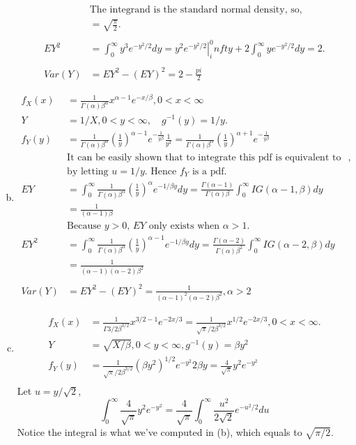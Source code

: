 \documentclass[letter]{article}
\newcommand{\Gal}{\Gamma(\alpha)}
\newcommand{\Iy}{\frac{1}{y}}
\newcommand{\Beal}{\beta^\alpha}
\newcommand{\intzi}{\int_0^\infty}
\begin{document}
\begin{enumerate}[(a)]
\begin{align*}
    & \text{The integrand is the standard normal density, so},\\
    & = \sqrt{\frac{\pi}{2}}.\\
    \\
    EY^2 & = \intzi y^3 e^{-y^2/2} dy = \left. y^2 e^{-y^2/2} \right|^0_infty + 2 \intzi ye^{-y^2/2} dy = 2.\\
    \\
    Var(Y) & = EY^2 - (EY)^2 = 2-\frac{pi}{2}
    \end{align*}
    \item 
    \begin{align*}
    f_X(x) & = \frac{1}{\Gal \Beal} x^{\alpha-1} e^{-x/\beta}, 0 < x < \infty \\
    Y & = 1/X, 0 < y < \infty, \quad g^{-1}(y) = 1/y.\\
    f_Y(y) & = \frac{1}{\Gal \Beal} (\frac{1}{y})^{\alpha-1} e^{-\frac{1}{y\beta}} \frac{1}{y^2} = 
    \frac{1}{\Gal \Beal} (\frac{1}{y})^{\alpha+1} e^{-\frac{1}{y\beta}} \\
    & \text{It can be easily shown that to integrate this pdf is equivalent to integrate a gamma density},\\
    & \text{by letting $u = 1/y$. Hence $f_Y$ is a pdf}.\\ 
    EY & = \intzi \frac{1}{\Gal \Beal} (\Iy)^\alpha e^{-1/\beta y} dy = \frac{\Gamma(\alpha-1)}{\Gal \beta} \intzi IG(\alpha-1, \beta) dy \\
    & = \frac{1}{(\alpha-1)\beta} \\
    & \text{Because $y > 0$, $EY$ only exists when $\alpha > 1$.}\\
    EY^2 & = \intzi \frac{1}{\Gal \Beal} (\Iy)^{\alpha-1} e^{-1/\beta y} dy = \frac{\Gamma(\alpha-2)}{\Gal \beta^2} \intzi IG(\alpha-2, \beta) dy \\
    & = \frac{1}{(\alpha-1)(\alpha-2)\beta^2}\\
    \\
    Var(Y) & = EY^2 - (EY)^2 = \frac{1}{(\alpha-1)^2(\alpha-2)\beta^2}, \alpha > 2
    \end{align*}
    \item
    \begin{align*}
    f_X(x) & = \frac{1}{\Gamma{3/2}\beta^{3/2}} x^{3/2-1} e^{-2x/3} = \frac{1}{\sqrt{\pi}/2 \beta^{3/2}} x^{1/2} e^{-2x/3}, 0 < x < \infty.\\
    Y & = \sqrt{X/\beta}, 0 < y < \infty, g^{-1}(y) = \beta y^2 \\
    f_Y(y) & = \frac{1}{\sqrt{\pi}/2 \beta^{3/2}} (\beta y^2)^{1/2} e^{-y^2} 2\beta y = \frac{4}{\sqrt{\pi}} y^2 e^{-y^2}\\
    \end{align*}
    Let $u = y/\sqrt{2}$,
    \[
    \intzi \frac{4}{\sqrt{\pi}} y^2 e^{-y^2}  = \frac{4}{\sqrt{\pi}} \intzi \frac{u^2}{2\sqrt{2}} e^{-u^2/2}du
    \]
    Notice the integral is what we've computed in (b), which equals to $\sqrt{\pi/2}$. 
    

\end{enumerate}
\end{document}
